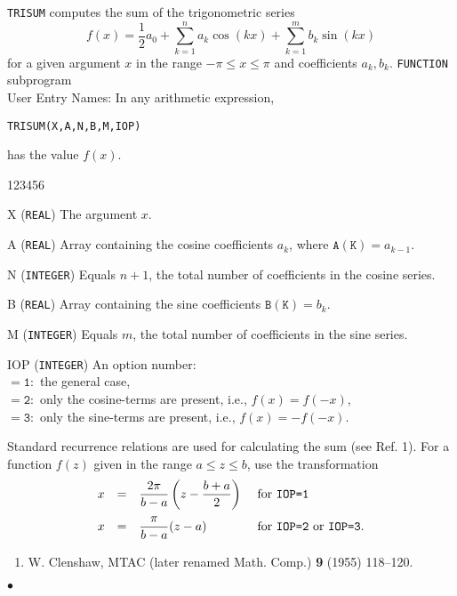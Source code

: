                              
                             
\Submitter{}                                 
{\tt TRISUM} computes the sum of the trigonometric series
$$ f(x) = \frac{1}{2} a_0 + \sum^n_{k=1}a_k\cos(kx) + \sum^m_{k=1}
b_k\sin(kx) $$
for a given argument $x$ in the range $-\pi\leq x \leq \pi$ and
coefficients $a_k, b_k$.
\Structure
{\tt FUNCTION} subprogram\\
User Entry Names: 
\Usage
In any arithmetic expression,
\begin{center}
{\tt TRISUM(X,A,N,B,M,IOP)}
\end{center}
has the value $f(x)$.
\begin{DLtt}{123456}
\item[X] ({\tt REAL}) The argument $x$.
\item[A] ({\tt REAL}) Array containing the cosine coefficients $a_k$,
where $\mathtt{A(K)}=a_{k-1}$.
\item[N] ({\tt INTEGER}) Equals $n+1$, the total number of coefficients
in the cosine series.
\item[B] ({\tt REAL}) Array containing the sine coefficients
$\mathtt{B(K)}=b_k$.
\item[M] ({\tt INTEGER}) Equals $m$, the total number of coefficients
in the sine series.
\item[IOP] ({\tt INTEGER}) An option number: \\
$\mathtt{= 1:}$ the general case, \\
$\mathtt{= 2:}$ only the cosine-terms are present, i.e., $f(x)=f(-x)$,\\
$\mathtt{= 3:}$ only the sine-terms are present, i.e., $f(x)=-f(-x)$.
\end{DLtt}
\Method
Standard recurrence relations are used for calculating the sum
(see Ref. 1).
\Notes
For a function $f(z)$ given in the range
$a\leq z\leq b$, use the transformation
$$\begin{array}{l@{\quad=\quad}ll}
\displaystyle x &
\displaystyle  \frac{2\pi}{b-a}\left( z -\frac{b+a}{2} \right)
&\displaystyle  \mbox{ for \tt IOP=1}\\[4mm]
\displaystyle  x &\displaystyle  \frac{\pi}{b-a}(z-a)
&\displaystyle  \mbox{ for {\tt IOP=2}  or {\tt IOP=3}}.
\end{array}$$
\Refer
\begin{enumerate}
\item W. Clenshaw,  MTAC (later renamed Math. Comp.) {\bf 9} (1955)
118--120.
\end{enumerate}
$\bullet$

